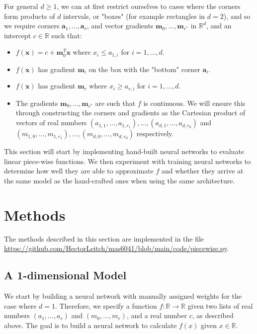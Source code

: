\documentclass{somasmsc}
\begin{document}
For general $d \geq 1$, we can at first restrict ourselves to cases where the corners form products of $d$ intervals, or "boxes" (for example rectangles in $d=2$), and so we require corners $\pmb{a}_1, \dots, \pmb{a}_{r}$, and vector gradients $\pmb{m}_0, \dots, \pmb{m}_{r^*}$ in $\mathbb{R}^d$, and an intercept $c \in \mathbb{R}$ such that:
\begin{itemize}
    \item $f(\pmb{x}) = c + \pmb{m}_0^T \pmb{x}$ where $x_i \leq a_{1,i}$ for $i=1, \dots, d$.
    \item $f(\pmb{x})$ has gradient $\pmb{m}_i$ on the box with the "bottom" corner $\pmb{a}_i$.
    \item $f(\pmb{x})$ has gradient $\pmb{m}_r$ where $x_i \geq a_{r,i}$ for $i=1, \dots, d$.
    \item The gradients $\pmb{m}_0, \dots, \pmb{m}_{r^*}$ are such that $f$ is continuous. We will ensure this through constructing the corners and gradients as the Cartesian product of vectors of real numbers $\left(a_{1,1}, \dots, a_{1, r_1}\right), \dots, \left(a_{d, 1}, \dots, a_{d, r_d}\right)$ and $\left(m_{1,0}, \dots, m_{1, r_1}\right), \dots, \left(m_{d, 0}, \dots, m_{d, r_d}\right)$ respectively.
\end{itemize}

This section will start by implementing hand-built neural networks to evaluate linear piece-wise functions. We then experiment with training neural networks to determine how well they are able to approximate $f$ and whether they arrive at the same model as the hand-crafted ones when using the same architecture.

\section{Methods}

The methods described in this section are implemented in the file \url{https://github.com/HectorLeitch/mas6041/blob/main/code/piecewise.py}.

\subsection{A 1-dimensional Model}\label{piece:1d}

We start by building a neural network with manually assigned weights for the case where $d=1$. Therefore, we specify a function $f: \mathbb{R} \rightarrow \mathbb{R}$ given two lists of real numbers $\left(a_1, \dots, a_r\right)$ and $\left(m_0, \dots, m_r\right)$, and a real number $c$, as described above. The goal is to build a neural network to calculate $f(x)$ given $x \in \mathbb{R}$.
\end{document}
